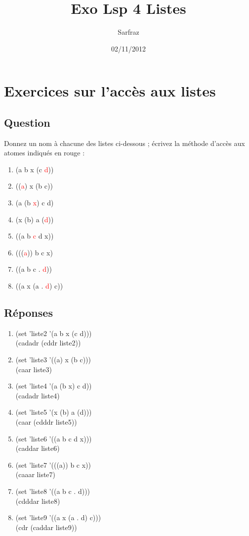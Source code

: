 \documentclass[a4paper, 11pt]{article}
\title{Exo Lsp 4 Listes}
\author{Sarfraz \bsc{kapasi}}
\date{02/11/2012}
\begin{document}
%
\maketitle
%
\section{Exercices sur l'accès aux listes}
\subsection{Question}
Donnez un nom à chacune des listes ci-dessous ; écrivez la méthode d'accès aux atomes indiqués en rouge :
\begin{enumerate}
    \item (a b x (c \textcolor{red}{d}))
    \item ((\textcolor{red}{a}) x (b c))
    \item (a (b \textcolor{red}{x}) c d)
    \item (x (b) a (\textcolor{red}{d}))
    \item ((a b \textcolor{red}{c} d x))
    \item (((\textcolor{red}{a})) b c x)
    \item ((a b c . \textcolor{red}{d}))
    \item ((a x (a . \textcolor{red}{d}) c))
\end{enumerate}
\subsection{Réponses}
\begin{enumerate}
    \item (set 'liste2 '(a b x (c d)))\\
          (cadadr (cddr liste2))
    \item (set 'liste3 '((a) x (b c)))\\
          (caar liste3)
    \item (set 'liste4 '(a (b x) c d))\\
          (cadadr liste4)
    \item (set 'liste5 '(x (b) a (d)))\\
          (caar (cdddr liste5))
    \item (set 'liste6 '((a b c d x)))\\
          (caddar liste6)
    \item (set 'liste7 '(((a)) b c x))\\
          (caaar liste7)
    \item (set 'liste8 '((a b c . d)))\\
          (cdddar liste8)
    \item (set 'liste9 '((a x (a . d) c)))\\
          (cdr (caddar liste9))
\end{enumerate}
%
\end{document}
